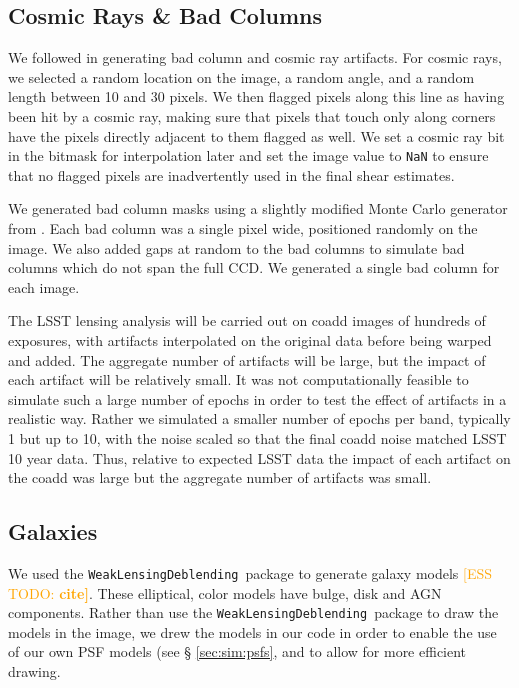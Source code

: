 \documentclass[twocolumn,twocolappendix,astrosym]{openjournal}
\newcommand{\esstodo}[1]{\textcolor{orange}{[ESS TODO: \bf #1]}}
\newcommand{\descwl}{\texttt{WeakLensingDeblending}}
\begin{document}
\subsection{Cosmic Rays \& Bad Columns} \label{sec:sim:cosmics_badcols}

We followed \citet{BeckerMdetCoadd} in generating bad column and cosmic ray artifacts.
For cosmic rays, we selected a random location on the image, a random angle, and a random
length between 10 and 30 pixels. We then flagged pixels along this line as having been hit
by a cosmic ray, making sure that pixels that touch only along corners have the pixels
directly adjacent to them flagged as well. We set a cosmic ray bit in the bitmask for
interpolation later and set the image value to \texttt{NaN} to ensure that no flagged
pixels are inadvertently used in the final shear estimates.

We generated bad column masks using a slightly modified Monte Carlo generator
from \citet{BeckerMdetCoadd}. Each bad column was a single pixel wide,
positioned randomly on the image. We also added gaps at random to the bad
columns to simulate bad columns which do not span the full CCD.  We generated
a single bad column for each image.

The LSST lensing analysis will be carried out on coadd images of hundreds of
exposures, with artifacts interpolated on the original data before being warped
and added.  The aggregate number of artifacts will be large, but the impact of
each artifact will be relatively small.  It was not computationally feasible to
simulate such a large number of epochs in order to test the effect of artifacts
in a realistic way.  Rather we simulated a smaller number of epochs per
band, typically
1 but up to 10, with the noise scaled so that the final coadd noise matched
LSST 10 year data.  Thus, relative to expected LSST data the impact of each
artifact on the coadd was large but the aggregate number of artifacts was
small.

\subsection{Galaxies} \label{sec:sim:galaxies}

We used the \descwl\ package to generate galaxy models \esstodo{cite}.  These
elliptical, color models have bulge, disk and AGN components.  Rather than use
the \descwl\ package to draw the models in the image, we drew the models in our
code in order to enable the use of our own PSF models (see \S
\ref{sec:sim:psfs}, and to allow for more efficient drawing.
\end{document}
